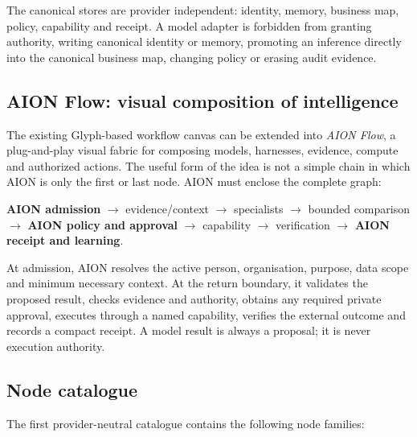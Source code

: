 The canonical stores are provider independent: identity, memory, business map,
policy, capability and receipt.  A model adapter is forbidden from granting
authority, writing canonical identity or memory, promoting an inference directly
into the canonical business map, changing policy or erasing audit evidence.

\subsection{AION Flow: visual composition of intelligence}

The existing Glyph-based workflow canvas can be extended into \emph{AION Flow}, a
plug-and-play visual fabric for composing models, harnesses, evidence, compute and
authorized actions.  The useful form of the idea is not a simple chain in which
AION is only the first or last node.  AION must enclose the complete graph:

\begin{center}
\textbf{AION admission} $\rightarrow$ evidence/context $\rightarrow$
specialists $\rightarrow$ bounded comparison $\rightarrow$
\textbf{AION policy and approval} $\rightarrow$ capability $\rightarrow$
verification $\rightarrow$ \textbf{AION receipt and learning}.
\end{center}

At admission, AION resolves the active person, organisation, purpose, data scope
and minimum necessary context.  At the return boundary, it validates the proposed
result, checks evidence and authority, obtains any required private approval,
executes through a named capability, verifies the external outcome and records a
compact receipt.  A model result is always a proposal; it is never execution
authority.

\subsection{Node catalogue}

The first provider-neutral catalogue contains the following node families:


